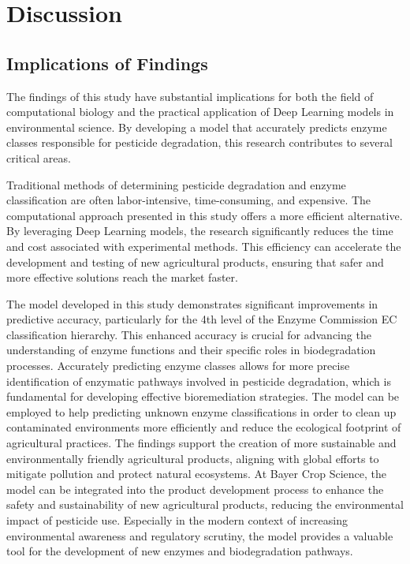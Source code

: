 \section{Discussion}

\subsection{Implications of Findings}
\label{sec:Implications of Findings}

The findings of this study have substantial implications for both the field of computational biology and the practical application of Deep Learning models in environmental science. By developing a model that accurately predicts enzyme classes responsible for pesticide degradation, this research contributes to several critical areas.

Traditional methods of determining pesticide degradation and enzyme classification are often labor-intensive, time-consuming, and expensive. The computational approach presented in this study offers a more efficient alternative. By leveraging Deep Learning models, the research significantly reduces the time and cost associated with experimental methods. This efficiency can accelerate the development and testing of new agricultural products, ensuring that safer and more effective solutions reach the market faster.

The model developed in this study demonstrates significant improvements in predictive accuracy, particularly for the 4th level of the Enzyme Commission EC classification hierarchy. This enhanced accuracy is crucial for advancing the understanding of enzyme functions and their specific roles in biodegradation processes. Accurately predicting enzyme classes allows for more precise identification of enzymatic pathways involved in pesticide degradation, which is fundamental for developing effective bioremediation strategies. The model can be employed to help predicting unknown enzyme classifications in order to clean up contaminated environments more efficiently and reduce the ecological footprint of agricultural practices. The findings support the creation of more sustainable and environmentally friendly agricultural products, aligning with global efforts to mitigate pollution and protect natural ecosystems. At Bayer Crop Science, the model can be integrated into the product development process to enhance the safety and sustainability of new agricultural products, reducing the environmental impact of pesticide use. Especially in the modern context of increasing environmental awareness and regulatory scrutiny, the model provides a valuable tool for the development of new enzymes and biodegradation pathways.

